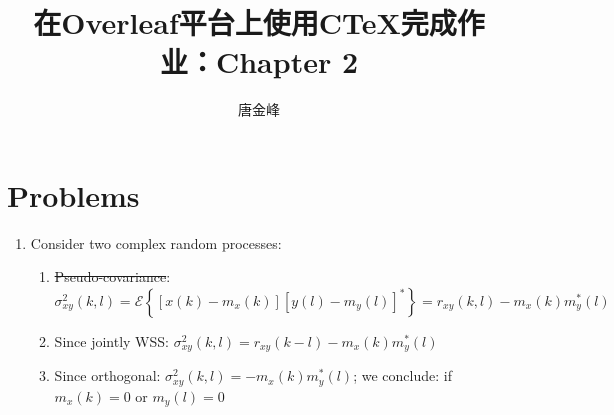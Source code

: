 \documentclass[11pt]{article}
\title{在Overleaf平台上使用C\TeX 完成作业：Chapter 2}
\author{唐金峰}
\newcommand\setItemnumber[1]{\setcounter{enumi}{\numexpr#1-1\relax}}  %
\begin{document}
\maketitle
\section*{Problems}
\begin{enumerate}[itemindent= 0pt]
    \setItemnumber{2}
    \item  Consider two complex random processes:
        \begin{enumerate}[itemindent= -5pt]
            \item \sout{Pseudo-covariance}: 
                $ \sigma_{xy}^2 (k, l)
                = \mathscr{E} \left\{ [x(k)-m_{x}(k)] [y(l)-m_{y}(l)]^* \right\}
                = r_{xy}(k,l) - m_x(k)m_y^*(l)
                $
            \item Since jointly WSS:
                $ \sigma_{xy}^2 (k, l)
                = r_{xy}(k-l) - m_x(k)m_y^*(l)
                $
            \item Since orthogonal:
                $ \sigma_{xy}^2 (k, l) = - m_x(k)m_y^*(l) $; we conclude: if $m_x(k) = 0$ or $m_y(l)=0$ 
        \end{enumerate}
\end{enumerate}
\end{document}
